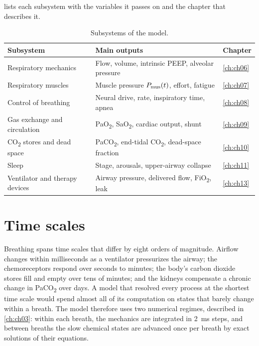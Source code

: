  lists each subsystem with the variables it passes on and the chapter that describes it.

\begin{table}[ht]
\centering
\caption{Subsystems of the model.}
\label{tab:overview-blocks}
\small
\begin{tabularx}{\linewidth}{@{}l X l@{}}
\toprule
Subsystem & Main outputs & Chapter \\
\midrule
Respiratory mechanics & Flow, volume, intrinsic PEEP, alveolar pressure & \ref{ch:ch06} \\
Respiratory muscles & Muscle pressure $P_{\mathrm{mus}}(t)$, effort, fatigue & \ref{ch:ch07} \\
Control of breathing & Neural drive, rate, inspiratory time, apnea & \ref{ch:ch08} \\
Gas exchange and circulation & PaO\textsubscript{2}, SaO\textsubscript{2}, cardiac output, shunt & \ref{ch:ch09} \\
CO\textsubscript{2} stores and dead space & PaCO\textsubscript{2}, end-tidal CO\textsubscript{2}, dead-space fraction & \ref{ch:ch10} \\
Sleep & Stage, arousals, upper-airway collapse & \ref{ch:ch11} \\
Ventilator and therapy devices & Airway pressure, delivered flow, FiO\textsubscript{2}, leak & \ref{ch:ch13} \\
\bottomrule
\end{tabularx}
\end{table}

\section{Time scales}
\label{sec:overview-timescales}
Breathing spans time scales that differ by eight orders of magnitude. Airflow changes within milliseconds as a ventilator pressurizes the airway; the chemoreceptors respond over seconds to minutes; the body's carbon dioxide stores fill and empty over tens of minutes; and the kidneys compensate a chronic change in PaCO\textsubscript{2} over days. A model that resolved every process at the shortest time scale would spend almost all of its computation on states that barely change within a breath. The model therefore uses two numerical regimes, described in \cref{ch:ch03}: within each breath, the mechanics are integrated in \SI{2}{\milli\second} steps, and between breaths the slow chemical states are advanced once per breath by exact solutions of their equations.

